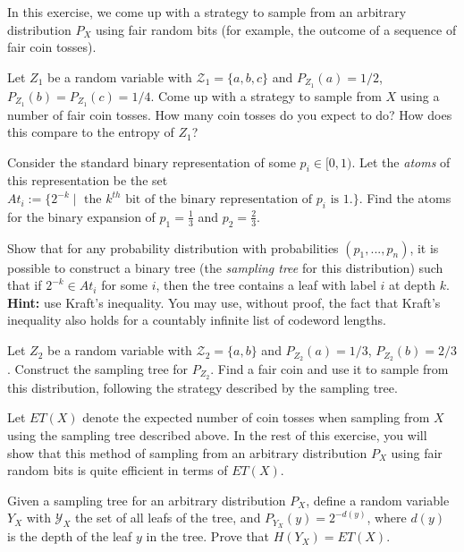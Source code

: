 \documentclass[a4paper,10pt,landscape,twocolumn]{scrartcl}
\begin{document}
\begin{exercise}
In this exercise, we come up with a strategy to sample from an arbitrary distribution $P_X$ using fair random bits (for example, the outcome of a sequence of fair coin tosses).
	\begin{subex}[(1pt)]
	Let $Z_1$ be a random variable with $\mathcal{Z}_1 = \{a,b,c\}$ and $P_{Z_1}(a) = 1/2$, $P_{Z_1}(b) = P_{Z_1}(c) = 1/4$. Come up with a strategy to sample from $X$ using a number of fair coin tosses. How many coin tosses do you expect to do? How does this compare to the entropy of $Z_1$?
	\end{subex}
	\begin{subex}[(1pt)]
	Consider the standard binary representation of some $p_i \in [0,1)$. Let the \emph{atoms} of this representation be the set $At_i := \{2^{-k} \mid \mbox{ the } k^{th} \mbox{ bit of the binary representation of } p_i \mbox{ is 1.}\}$. Find the atoms for the binary expansion of $p_1 = \frac{1}{3}$ and $p_2 = \frac{2}{3}$.
	\end{subex}
	\begin{subex}[(2pt)]
	Show that for any probability distribution with probabilities $(p_1, ..., p_n)$, it is possible to construct a binary tree (the \emph{sampling tree} for this distribution) such that if $2^{-k} \in At_i$ for some $i$, then the tree contains a leaf with label $i$ at depth $k$. \textbf{Hint:} use Kraft's inequality. You may use, without proof, the fact that Kraft's inequality also holds for a countably infinite list of codeword lengths.
	\end{subex}
	\begin{subex}[(1pt)]
	Let $Z_2$ be a random variable with $\mathcal{Z}_2 = \{a,b\}$ and $P_{Z_2}(a) = 1/3$, $P_{Z_2}(b) = 2/3$. Construct the sampling tree for $P_{Z_2}$. Find a fair coin and use it to sample from this distribution, following the strategy described by the sampling tree.
	\end{subex}
Let $ET(X)$ denote the expected number of coin tosses when sampling from $X$ using the sampling tree described above. In the rest of this exercise, you will show that this method of sampling from an arbitrary distribution $P_X$ using fair random bits is quite efficient in terms of $ET(X)$.
	\begin{subex}[(2pt)]
	Given a sampling tree for an arbitrary distribution $P_X$, define a random variable $Y_X$ with $\mathcal{Y}_X$ the set of all leafs of the tree, and $P_{Y_X}(y) = 2^{-d(y)}$, where $d(y)$ is the depth of the leaf $y$ in the tree. Prove that $H(Y_X) = ET(X)$.

\end{subex}
\end{exercise}
\end{document}
